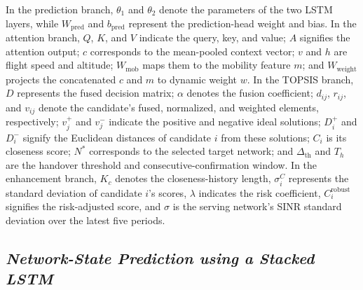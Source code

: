 \documentclass[10pt,a4paper]{article}
\begin{document}
In the prediction branch, $\theta_1$ and $\theta_2$ denote the parameters of the two LSTM layers, while $W_{\mathrm{pred}}$ and $b_{\mathrm{pred}}$ represent the prediction-head weight and bias. In the attention branch, $Q$, $K$, and $V$ indicate the query, key, and value; $A$ signifies the attention output; $c$ corresponds to the mean-pooled context vector; $v$ and $h$ are flight speed and altitude; $W_{\mathrm{mob}}$ maps them to the mobility feature $m$; and $W_{\mathrm{weight}}$ projects the concatenated $c$ and $m$ to dynamic weight $w$. In the TOPSIS branch, $D$ represents the fused decision matrix; $\alpha$ denotes the fusion coefficient; $d_{ij}$, $r_{ij}$, and $v_{ij}$ denote the candidate's fused, normalized, and weighted elements, respectively; $v_j^+$ and $v_j^-$ indicate the positive and negative ideal solutions; $D_i^+$ and $D_i^-$ signify the Euclidean distances of candidate $i$ from these solutions; $C_i$ is its closeness score; $N^*$ corresponds to the selected target network; and $\Delta_{\mathrm{th}}$ and $T_h$ are the handover threshold and consecutive-confirmation window. In the enhancement branch, $K_c$ denotes the closeness-history length, $\sigma_i^C$ represents the standard deviation of candidate $i$'s scores, $\lambda$ indicates the risk coefficient, $C_i^{\mathrm{robust}}$ signifies the risk-adjusted score, and $\sigma$ is the serving network's SINR standard deviation over the latest five periods.

\subsection{\textit{Network-State Prediction using a Stacked LSTM}}
\end{document}
